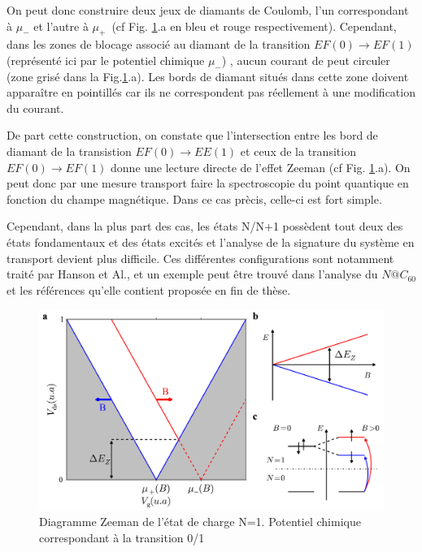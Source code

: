 On peut donc construire deux jeux de diamants de Coulomb, l'un correspondant à $\mu_{-}$ et l'autre à $\mu_{+}$~(cf Fig. \ref{charge_discharge}.a en bleu et rouge respectivement). Cependant, dans les zones de blocage associé au diamant de la transition $EF(0)\rightarrow EF(1)$ (représenté ici par le potentiel chimique $\mu_{-}$) , aucun courant de peut circuler (zone grisé dans la Fig.\ref{charge_discharge}.a). Les bords de diamant situés dans cette zone doivent apparaître en pointillés car ils ne correspondent pas réellement à une modification du courant.

De part cette construction, on constate que l'intersection entre les bord de diamant de la transistion $EF(0)\rightarrow EE(1)$ et ceux de la transition $EF(0)\rightarrow EF(1)$ donne une lecture directe de l'effet Zeeman (cf Fig. \ref{charge_discharge}.a). On peut donc par une mesure transport faire la spectroscopie du point quantique en fonction du champe magnétique. Dans ce cas prècis, celle-ci est fort simple.

 Cependant, dans la plus part des cas, les états N/N+1 possèdent tout deux des états fondamentaux et des états excités et l'analyse de la signature du système en transport devient plus difficile. Ces différentes configurations sont notamment traité par Hanson et Al., et un exemple peut \^etre trouvé dans l'analyse du $N@C_{60}$ et les références qu'elle contient proposée en fin de thèse.

\begin{figure}
\includegraphics[scale=0.5]{Theorie/Transport/figure4/figure4.pdf} 
\caption{Diagramme Zeeman de l'état de charge N=1. Potentiel chimique correspondant à la transition 0/1}
\label{charge_discharge}
\end{figure}

